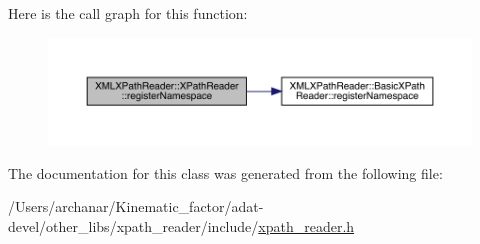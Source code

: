 Here is the call graph for this function\+:
\nopagebreak
\begin{figure}[H]
\begin{center}
\leavevmode
\includegraphics[width=350pt]{d3/d5a/classXMLXPathReader_1_1XPathReader_a4df21ae718977be11eb5669002522ebb_cgraph}
\end{center}
\end{figure}


The documentation for this class was generated from the following file\+:\begin{DoxyCompactItemize}
\item 
/\+Users/archanar/\+Kinematic\+\_\+factor/adat-\/devel/other\+\_\+libs/xpath\+\_\+reader/include/\mbox{\hyperlink{adat-devel_2other__libs_2xpath__reader_2include_2xpath__reader_8h}{xpath\+\_\+reader.\+h}}\end{DoxyCompactItemize}
